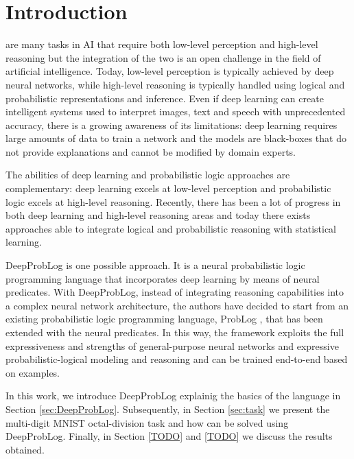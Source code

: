 \section{Introduction}
 are many tasks in AI that require both low-level perception and high-level reasoning but the integration of the two is an open challenge in the field of artificial intelligence. Today, low-level perception is typically achieved by deep neural networks, while high-level reasoning is typically handled using logical and probabilistic representations and inference. Even if deep learning can create intelligent systems used to interpret images, text and speech with unprecedented accuracy, there is a growing awareness of its limitations: deep learning requires large amounts of data to train a network and the models are black-boxes that do not provide explanations and cannot be modified by domain experts. 

The abilities of deep learning and probabilistic logic approaches are complementary: deep learning excels at low-level perception and probabilistic logic excels at high-level reasoning. Recently, there has been a lot of progress in both deep learning and high-level reasoning areas and today there exists approaches able to integrate logical and probabilistic reasoning with statistical learning.

DeepProbLog \cite{DeepProbLog} is one possible approach. It is a neural probabilistic logic programming language that incorporates deep learning by means of neural predicates. With DeepProbLog, instead of integrating reasoning capabilities into a complex neural network architecture, the authors have decided to start from an existing probabilistic logic programming language, ProbLog \cite{ProbLog}, that has been extended with the neural predicates. In this way, the framework exploits the full expressiveness and strengths of general-purpose neural networks and expressive probabilistic-logical modeling and reasoning and can be trained end-to-end based on examples.

In this work, we introduce DeepProbLog explainig the basics of the language in Section \ref{sec:DeepProbLog}. Subsequently, in Section \ref{sec:task} we present the multi-digit MNIST octal-division task and how can be solved using DeepProbLog. Finally, in Section \ref{TODO} and \ref{TODO} we discuss the results obtained.

